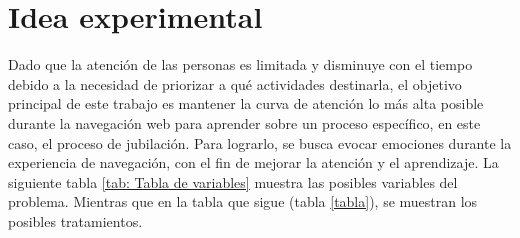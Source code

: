 \section{Idea experimental}

Dado que la atención de las personas es limitada y disminuye con el tiempo debido a la necesidad de priorizar a qué actividades destinarla, el objetivo principal de este trabajo es mantener la curva de atención lo más alta posible durante la navegación web para aprender sobre un proceso específico, en este caso, el proceso de jubilación. Para lograrlo, se busca evocar emociones durante la experiencia de navegación, con el fin de mejorar la atención y el aprendizaje. La siguiente tabla \ref{tab: Tabla de variables} muestra las posibles variables del problema. Mientras que en la tabla que sigue (tabla \ref{tabla}), se muestran los posibles tratamientos. 

